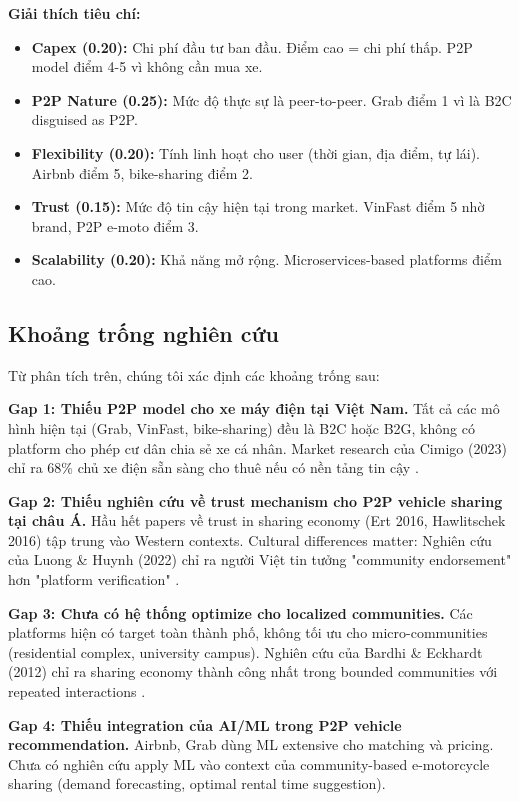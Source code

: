 \textbf{Giải thích tiêu chí:}
\begin{itemize}[leftmargin=*]
    \item \textbf{Capex (0.20):} Chi phí đầu tư ban đầu. Điểm cao = chi phí thấp. P2P model điểm 4-5 vì không cần mua xe.
    \item \textbf{P2P Nature (0.25):} Mức độ thực sự là peer-to-peer. Grab điểm 1 vì là B2C disguised as P2P.
    \item \textbf{Flexibility (0.20):} Tính linh hoạt cho user (thời gian, địa điểm, tự lái). Airbnb điểm 5, bike-sharing điểm 2.
    \item \textbf{Trust (0.15):} Mức độ tin cậy hiện tại trong market. VinFast điểm 5 nhờ brand, P2P e-moto điểm 3.
    \item \textbf{Scalability (0.20):} Khả năng mở rộng. Microservices-based platforms điểm cao.
\end{itemize}

\subsection{Khoảng trống nghiên cứu}

Từ phân tích trên, chúng tôi xác định các khoảng trống sau:

\textbf{Gap 1: Thiếu P2P model cho xe máy điện tại Việt Nam.} Tất cả các mô hình hiện tại (Grab, VinFast, bike-sharing) đều là B2C hoặc B2G, không có platform cho phép cư dân chia sẻ xe cá nhân. Market research của Cimigo (2023) chỉ ra 68\% chủ xe điện sẵn sàng cho thuê nếu có nền tảng tin cậy \cite{cimigo2023}.

\textbf{Gap 2: Thiếu nghiên cứu về trust mechanism cho P2P vehicle sharing tại châu Á.} Hầu hết papers về trust in sharing economy (Ert 2016, Hawlitschek 2016) tập trung vào Western contexts. Cultural differences matter: Nghiên cứu của Luong \& Huynh (2022) chỉ ra người Việt tin tưởng "community endorsement" hơn "platform verification" \cite{luong2022}.

\textbf{Gap 3: Chưa có hệ thống optimize cho localized communities.} Các platforms hiện có target toàn thành phố, không tối ưu cho micro-communities (residential complex, university campus). Nghiên cứu của Bardhi \& Eckhardt (2012) chỉ ra sharing economy thành công nhất trong bounded communities với repeated interactions \cite{bardhi2012}.

\textbf{Gap 4: Thiếu integration của AI/ML trong P2P vehicle recommendation.} Airbnb, Grab dùng ML extensive cho matching và pricing. Chưa có nghiên cứu apply ML vào context của community-based e-motorcycle sharing (demand forecasting, optimal rental time suggestion).

